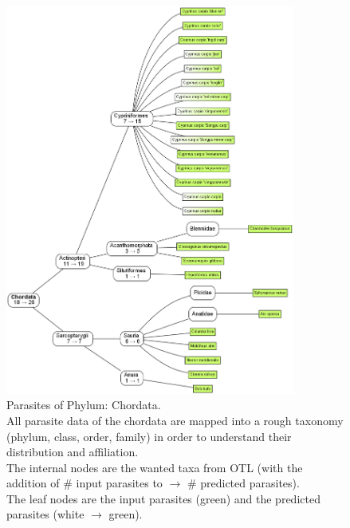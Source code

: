     \begin{figure}[h!]
      \centering
      \includegraphics[trim = 0mm 0mm 0mm 0mm, clip, width=0.85\textwidth]{Figures/ChordataParasites.png}
      \caption{Parasites of Phylum: Chordata. \\
        All parasite data of the chordata are mapped into a rough taxonomy (phylum, class, order, 
          family) in order to understand their distribution and affiliation. \\
        The internal nodes are the wanted taxa from OTL (with the addition of \# input parasites to 
          $\rightarrow$ \# predicted parasites). \\
        The leaf nodes are the input parasites (green) and the predicted parasites (white $\rightarrow$ 
          green).}
      \label{fig:ChordataParasites}
    \end{figure}

